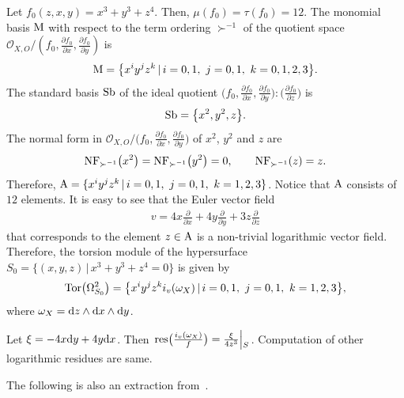 \documentclass[10pt,a4paper]{amsart}
\numberwithin{equation}{section}
\begin{document}
\begin{Example}
Let $ f_0(z,x,y) = x^3+y^3+z^4$. Then, $ \mu(f_0)=\tau(f_0)=12$.
The monomial basis $ {\rm M} $ with respect to the term ordering $ \succ^{-1} $ of the quotient space
$ {\mathcal O}_{X,O}/(f_0, \frac{\partial f_0}{\partial x}, \frac{\partial f_0}{\partial y}) $ is
\begin{gather*}
{\rm M} = \big\{ x^i y^j z^k \,|\, i=0,1, \ j=0,1, \ k=0,1,2,3 \big\}.
\end{gather*}
The standard basis $ {\rm Sb}$ of the ideal quotient
$\big(f_0, \frac{\partial f_0}{\partial x}, \frac{\partial f_0}{\partial y}\big): \big(\frac{\partial f_0}{\partial z}\big)$ is
\begin{gather*}
{\rm Sb} = \big\{ x^2, y^2, z \big\}.
\end{gather*}
The normal form in ${\mathcal O}_{X,O}/\big(f_0, \frac{\partial f_0}{\partial x}, \frac{\partial f_0}{\partial y}\big)$ of $x^2$, $y^2$ and $z$ are
\begin{gather*}
{\rm NF}_{\succ^{-1}}\big(x^2\big) = {\rm NF}_{\succ^{-1}}\big(y^2\big) = 0,\qquad
 {\rm NF}_{\succ^{-1}}(z) = z.
\end{gather*}
Therefore,
$ {\rm A} = \{x^iy^jz^k \,|\, i=0,1, \ j=0,1, \ k=1,2,3 \}$. Notice that ${\rm A}$ consists of $12$ elements. It is easy to see that the Euler vector field
\begin{gather*}
v= 4x\frac{\partial}{\partial x} + 4y\frac{\partial}{\partial y} +3z\frac{\partial}{\partial z}
\end{gather*}
that corresponds to the element $ z \in {\rm A} $ is a non-trivial logarithmic vector field. Therefore, the torsion module of the hypersurface
$ S_0 = \big\{ (x, y,z) \,|\, x^3+y^3+z^4=0 \big\} $ is given by
\begin{gather*}
{\rm Tor}\big(\Omega_{S_0}^2\big) = \big\{ x^iy^jz^k i_v(\omega_X) \,|\, i=0,1, \ j=0,1, \ k=1,2,3 \big\},
\end{gather*}
where $ \omega_X = {\rm d}z \wedge {\rm d}x \wedge {\rm d}y$.

Let $ \xi = -4x{\rm d}y+4y{\rm d}x$. Then $\left. {\rm res}\big(\frac{i_v(\omega_X)}{f}\big) = \frac{\xi}{4z^3}\middle|\raisebox{-0.7ex}[1ex][-2ex]{{\hspace{-1mm}\;$_S$}}\right.$. Computation of other logarithmic residues are same.
\end{Example}

The following is also an extraction from~\cite{TN20}.
\end{document}
